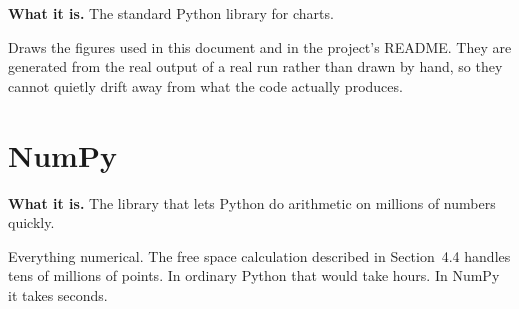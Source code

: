 \begin{plainbox}
\textbf{What it is.} The standard Python library for charts.
\end{plainbox}

\begin{project}
Draws the figures used in this document and in the project's README. They are generated from the
real output of a real run rather than drawn by hand, so they cannot quietly drift away from what
the code actually produces.
\end{project}

\section{NumPy}

\begin{plainbox}
\textbf{What it is.} The library that lets Python do arithmetic on millions of numbers quickly.
\end{plainbox}

\begin{project}
Everything numerical. The free space calculation described in Section~4.4 handles tens of millions
of points. In ordinary Python that would take hours. In NumPy it takes seconds.
\end{project}
